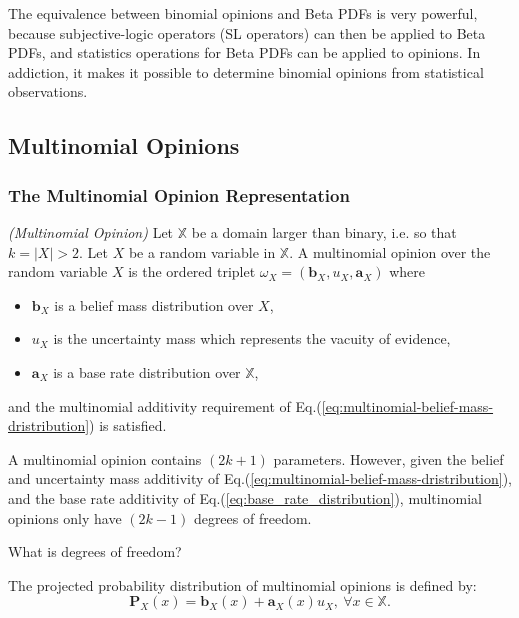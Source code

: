 The equivalence between binomial opinions and Beta PDFs is very powerful, because subjective-logic operators (SL operators) can then be applied to Beta PDFs, and statistics operations for Beta PDFs can be applied to opinions. In addiction, it makes it possible to determine binomial opinions from statistical observations.

\subsection{Multinomial Opinions}

\subsubsection{The Multinomial Opinion Representation}

\begin{definition}
	\emph{(Multinomial Opinion)} Let $\mathbb{X}$ be a domain larger than binary, i.e.
so that $k = |X| > 2$. Let $X$ be a random variable in $\mathbb{X}$. A multinomial opinion over
the random variable $X$ is the ordered triplet $\omega_X = (\mathbf{b}_X, u_X , \mathbf{a}_X)$ where
	\begin{itemize}
		\item $\mathbf{b}_X$ is a belief mass distribution over $X$,
		\item $u_X$ is the uncertainty mass which represents the vacuity of evidence,
		\item $\mathbf{a}_X$ is a base rate distribution over $\mathbb{X}$,
	\end{itemize}
	and the multinomial additivity requirement of Eq.(\ref{eq:multinomial-belief-mass-dristribution}) is satisfied.
\end{definition}

A multinomial opinion contains $(2k + 1)$ parameters. However, given the belief and uncertainty mass additivity of Eq.(\ref{eq:multinomial-belief-mass-dristribution}), and the base rate additivity of Eq.(\ref{eq:base_rate_distribution}), multinomial opinions only have $(2k - 1)$ degrees of freedom.

\begin{question}
	What is degrees of freedom?
\end{question}

The projected probability distribution of multinomial opinions is defined by:
\begin{equation}
	\mathbf{P}_X(x) = \mathbf{b}_X(x) + \mathbf{a}_X(x) u_X,\ \forall x \in \mathbb{X}\text{.}
\end{equation}

